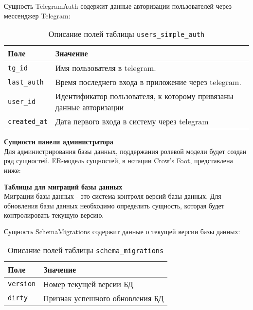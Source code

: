 Сущность TelegramAuth содержит данные авторизации пользователей через мессенджер Telegram:
\begin{table}[!ht]
    \caption{Описание полей таблицы \texttt{users\_simple\_auth}}
    \label{tbl:telegram_auth}
    \begin{center}
        \begin{tabular}{|p{}p{}|}
            \hline
            \textbf{Поле} & \textbf{Значение} \\\hline
            \texttt{tg\_id} & Имя пользователя в telegram. \\\hline
            \texttt{last\_auth} & Время последнего входа в приложение через telegram. \\\hline
            \texttt{user\_id} & Идентификатор пользователя, к которому привязаны данные авторизации \\\hline
            \texttt{created\_at} & Дата первого входа в систему через telegram \\\hline
        \end{tabular}
    \end{center}
\end{table}
\newpage

\noindent\textbf{Сущности панели администратора}\\
Для администрирования базы данных, поддержания ролевой модели будет создан ряд сущностей.
ER-модель сущностей, в нотации Crow’s Foot, представлена ниже:

\newpage
\noindent\textbf{Таблицы для миграций базы данных}\\
Миграции базы данных - это система контроля версий базы данных.
Для обновления базы данных необходимо определить сущность, которая будет контролировать текущую версию.

Сущность SchemaMigrations содержит данные о текущей версии базы данных:
\begin{table}[!ht]
    \caption{Описание полей таблицы \texttt{schema\_migrations}}
    \label{tbl:schema_migrations}
    \begin{center}
        \begin{tabular}{|p{}p{}|}
            \hline
            \textbf{Поле} & \textbf{Значение} \\\hline
            \texttt{version} & Номер текущей версии БД \\\hline
            \texttt{dirty} & Признак успешного обновления БД \\\hline
        \end{tabular}
    \end{center}
\end{table}

